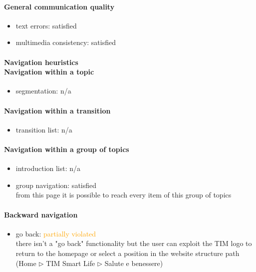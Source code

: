 \begin{enumerate}
	\paragraph*{General communication quality}
	\begin{itemize}
		\item text errors: satisfied
		\item multimedia consistency: satisfied
	\end{itemize}

	\paragraph*{Navigation heuristics \\ Navigation within a topic}
	\begin{itemize}
		\item segmentation: n/a
	\end{itemize}	
	
	\paragraph*{Navigation within a transition}
	\begin{itemize}
		\item transition list: n/a
	\end{itemize}
	
	\paragraph*{Navigation within a group of topics}
	\begin{itemize}
		\item introduction list: n/a
		\item group navigation: satisfied\\
		from this page it is possible to reach every item of this group of topics
	\end{itemize}

	\paragraph*{Backward navigation}
	\begin{itemize}
		\item go back: \textcolor {orange}{partially violated}\\
		there isn't a "go back" functionality but the user can exploit the TIM logo to return to the homepage or select a position in the website structure path (Home $\triangleright$ TIM Smart Life $\triangleright$ Salute e benessere)
	\end{itemize}
	

\end{enumerate}
